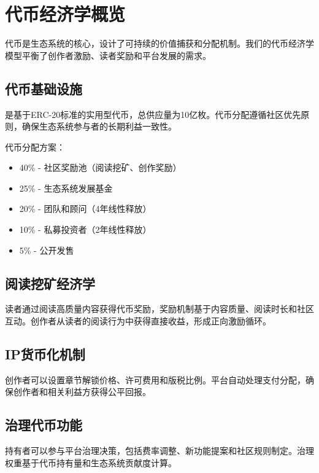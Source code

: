 \section{代币经济学概览}\label{sec:tokenomics-overview-cn}

\tip{}代币是\storyhouse{}生态系统的核心，设计了可持续的价值捕获和分配机制。我们的代币经济学模型平衡了创作者激励、读者奖励和平台发展的需求。

\subsection{\tip{}代币基础设施}

\tip{}是基于ERC-20标准的实用型代币，总供应量为10亿枚。代币分配遵循社区优先原则，确保生态系统参与者的长期利益一致性。

代币分配方案：
\begin{itemize}
\item 40\% - 社区奖励池（阅读挖矿、创作奖励）
\item 25\% - 生态系统发展基金
\item 20\% - 团队和顾问（4年线性释放）
\item 10\% - 私募投资者（2年线性释放）
\item 5\% - 公开发售
\end{itemize}

\subsection{阅读挖矿经济学}

读者通过阅读高质量内容获得\tip{}代币奖励，奖励机制基于内容质量、阅读时长和社区互动。创作者从读者的阅读行为中获得直接收益，形成正向激励循环。

\subsection{IP货币化机制}

创作者可以设置章节解锁价格、许可费用和版税比例。平台自动处理支付分配，确保创作者和相关利益方获得公平回报。

\subsection{治理代币功能}

\tip{}持有者可以参与平台治理决策，包括费率调整、新功能提案和社区规则制定。治理权重基于代币持有量和生态系统贡献度计算。